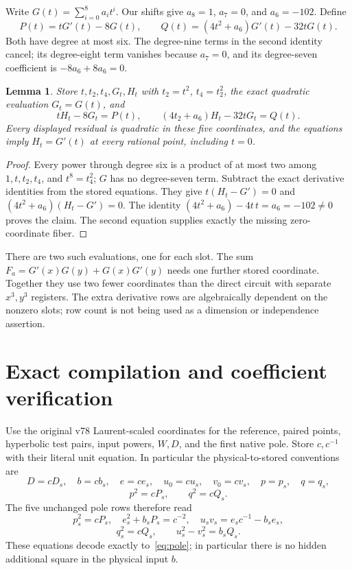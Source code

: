 \documentclass[11pt,a4paper]{article}
\newtheorem{lemma}[theorem]{Lemma}
\begin{document}
Write $G(t)=\sum_{i=0}^8a_it^i$. Our shifts give $a_8=1$, $a_7=0$,
and $a_6=-102$. Define
\[
 P(t)=tG'(t)-8G(t),\qquad
 Q(t)=(4t^2+a_6)G'(t)-32tG(t).
\]
Both have degree at most six. The degree-nine terms in the second
identity cancel; its degree-eight term vanishes because $a_7=0$, and
its degree-seven coefficient is $-8a_6+8a_6=0$.

\begin{lemma}\label{lem:derivative-circuit}
Store $t,t_2,t_4,G_t,H_t$ with $t_2=t^2$, $t_4=t_2^2$, the exact
quadratic evaluation $G_t=G(t)$, and
\[
 tH_t-8G_t=P(t),\qquad
 (4t_2+a_6)H_t-32tG_t=Q(t).
\]
Every displayed residual is quadratic in these five coordinates, and
the equations imply $H_t=G'(t)$ at every rational point, including $t=0$.
\end{lemma}
\begin{proof}
Every power through degree six is a product of at most two among
$1,t,t_2,t_4$, and $t^8=t_4^2$; $G$ has no degree-seven term.
Subtract the exact derivative identities from the stored equations.
They give $t(H_t-G')=0$ and $(4t^2+a_6)(H_t-G')=0$.
The identity $(4t^2+a_6)-4t\,t=a_6=-102\ne0$ proves the claim.
The second equation supplies exactly the missing zero-coordinate fiber.
\end{proof}

There are two such evaluations, one for each slot. The sum
$F_a=G'(x)G(y)+G(x)G'(y)$ needs one further stored coordinate.
Together they use two fewer coordinates than the direct circuit with
separate $x^3,y^3$ registers. The extra derivative rows are algebraically
dependent on the nonzero slots; row count is not being used as a
dimension or independence assertion.

\section{Exact compilation and coefficient verification}

Use the original v78 Laurent-scaled coordinates for the reference,
paired points, hyperbolic test pairs, input powers, $W,D$, and the first
native pole. Store $c,c^{-1}$ with their literal unit equation.
In particular the physical-to-stored conventions are
\[
 D=cD_s,\quad b=cb_s,\quad e=ce_s,\quad
 u_0=cu_s,\quad v_0=cv_s,\quad p=p_s,\quad q=q_s,
\]
\[
 p^2=cP_s,\qquad q^2=cQ_s.
\]
The five unchanged pole rows therefore read
\[
 p_s^2=cP_s,\quad e_s^2+b_sP_s=c^{-2},\quad
 u_sv_s=e_sc^{-1}-b_se_s,
\]
\[
 q_s^2=cQ_s,\qquad u_s^2-v_s^2=b_sQ_s.
\]
These equations decode exactly to~\eqref{eq:pole}; in particular
there is no hidden additional square in the physical input $b$.
\end{document}
